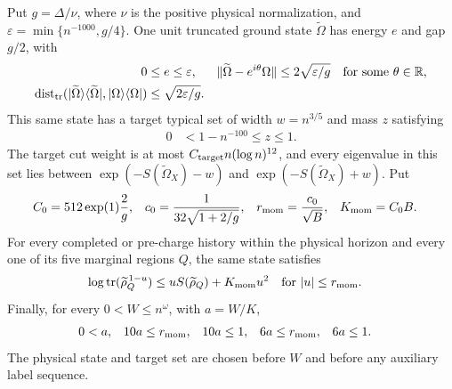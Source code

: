 \begin{lemma}
    Put $g=\Delta/\nu$, where $\nu$ is the positive physical normalization,
    and $\varepsilon=\min\{n^{-1000},g/4\}$.  One unit truncated ground
    state $\widetilde\Omega$ has energy $e$ and gap $g/2$, with
    \begin{align}
        0 & \leq e\leq\varepsilon,                                            &
        \|\widetilde\Omega-e^{i\theta}\Omega\|
          & \leq2\sqrt{\varepsilon/g}\quad\text{for some }\theta\in\mathbb R,
        \nonumber                                                               \\
        \operatorname{dist}_{\rm tr}
        (|\widetilde\Omega\rangle\langle\widetilde\Omega|,
        |\Omega\rangle\langle\Omega|)
          & \leq\sqrt{2\varepsilon/g}.
        \label{eq:arealaw-target-sharp-truncation}
    \end{align}
    This same state has a target
    typical set of width $w=n^{3/5}$ and mass $z$ satisfying
    \begin{align}
        0 & <1-n^{-100}\leq z\leq1.
        \label{eq:arealaw-target-sharp-moment-mass}
    \end{align}
    The target cut weight is at most $C_{\rm target}n(\log n)^{12}$, and every
    eigenvalue in this set lies between
    $\exp(-S(\widetilde\Omega_X)-w)$ and
    $\exp(-S(\widetilde\Omega_X)+w)$.
    Put
    \begin{align}
        C_0         & =512\exp(1)\frac2g,      &
        c_0         & =\frac1{32\sqrt{1+2/g}}, &
        r_{\rm mom} & =\frac{c_0}{\sqrt B},    &
        K_{\rm mom} & =C_0B.
        \label{eq:arealaw-target-sharp-common-moments}
    \end{align}
    For every completed or pre-charge history within the physical horizon
    and every one of its five marginal regions $Q$, the same state satisfies
    \begin{align}
        \log\operatorname{tr}(\widetilde\rho_Q^{\,1-u})
         & \leq uS(\widetilde\rho_Q)+K_{\rm mom}u^2
         &                                          & \text{for }|u|\leq r_{\rm mom}.
        \label{eq:arealaw-target-sharp-common-moment-bound}
    \end{align}
    Finally, for every $0<W\leq n^\omega$, with $a=W/K$,
    \begin{align}
        0 & <a, & 10a               & \leq r_{\rm mom}, & 10a    & \leq1,
          & 6a  & \leq r_{\rm mom}, & 6a                & \leq1.
        \label{eq:arealaw-target-sharp-smallness}
    \end{align}
    The physical state and target set are chosen before $W$ and before
    any auxiliary label sequence.
\end{lemma}

